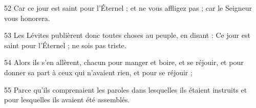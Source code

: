 \par 52 Car ce jour est saint pour l'Éternel ; et ne vous affligez pas ; car le Seigneur vous honorera.
\par 53 Les Lévites publièrent donc toutes choses au peuple, en disant : Ce jour est saint pour l'Éternel ; ne sois pas triste.
\par 54 Alors ils s'en allèrent, chacun pour manger et boire, et se réjouir, et pour donner sa part à ceux qui n'avaient rien, et pour se réjouir ;
\par 55 Parce qu'ils comprenaient les paroles dans lesquelles ils étaient instruits et pour lesquelles ils avaient été assemblés.

